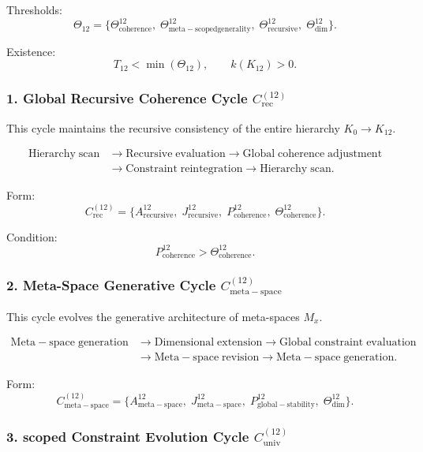 Thresholds:
\[
  \Theta_{12}
  =
  \{
     \Theta^{12}_{\mathrm{coherence}},\;
     \Theta^{12}_{\mathrm{meta\!-\!scoped generality}},\;
     \Theta^{12}_{\mathrm{recursive}},\;
     \Theta^{12}_{\mathrm{dim}}
  \}.
\]

Existence:
\[
  T_{12}<\min(\Theta_{12}),\qquad k(K_{12})>0.
\]


\subsubsection{1. Global Recursive Coherence Cycle $C_{\mathrm{rec}}^{(12)}$}

This cycle maintains the recursive consistency of the entire hierarchy
$K_0 \to K_{12}$.

\[
  \begin{aligned}
  \mathrm{Hierarchy\;scan}
  &\to \mathrm{Recursive\;evaluation}
  \to \mathrm{Global\;coherence\;adjustment}\\
  &\to \mathrm{Constraint\;reintegration}
  \to \mathrm{Hierarchy\;scan}.
  \end{aligned}
\]

Form:
\[
  C_{\mathrm{rec}}^{(12)}
  =
  \{
     A^{12}_{\mathrm{recursive}},\;
     J^{12}_{\mathrm{recursive}},\;
     P^{12}_{\mathrm{coherence}},\;
     \Theta^{12}_{\mathrm{coherence}}
  \}.
\]

Condition:
\[
   P^{12}_{\mathrm{coherence}}>\Theta^{12}_{\mathrm{coherence}}.
\]


\subsubsection{2. Meta-Space Generative Cycle $C_{\mathrm{meta\!-\!space}}^{(12)}$}

This cycle evolves the generative architecture of meta-spaces $M_x$.

\[
  \begin{aligned}
  \mathrm{Meta\!-\!space\;generation}
  &\to \mathrm{Dimensional\;extension}
  \to \mathrm{Global\;constraint\;evaluation}\\
  &\to \mathrm{Meta\!-\!space\;revision}
  \to \mathrm{Meta\!-\!space\;generation}.
  \end{aligned}
\]

Form:
\[
  C_{\mathrm{meta\!-\!space}}^{(12)}
  =
  \{
    A^{12}_{\mathrm{meta\!-\!space}},\;
    J^{12}_{\mathrm{meta\!-\!space}},\;
    P^{12}_{\mathrm{global\!-\!stability}},\;
    \Theta^{12}_{\mathrm{dim}}
  \}.
\]


\subsubsection{3. scoped Constraint Evolution Cycle $C_{\mathrm{univ}}^{(12)}$}

